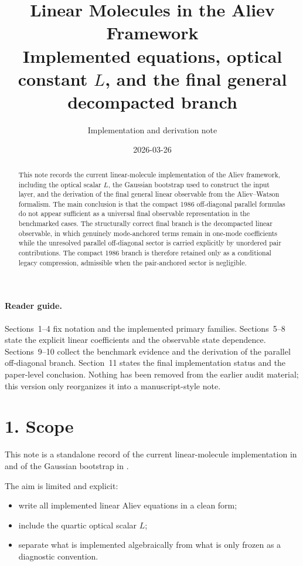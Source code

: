\documentclass[11pt]{article}
\title{Linear Molecules in the Aliev Framework\\
\large Implemented equations, optical constant $L$, and the final general decompacted branch}
\author{Implementation and derivation note}
\date{2026-03-26}
\begin{document}
\maketitle

\begin{abstract}
This note records the current linear-molecule implementation of the Aliev
framework, including the optical scalar $L$, the Gaussian bootstrap used to
construct the input layer, and the derivation of the final general linear
observable from the Aliev--Watson formalism. The main conclusion is that the
compact 1986 off-diagonal parallel formulas do not appear sufficient as a
universal final observable representation in the benchmarked cases. The
structurally correct final branch is the
decompacted linear observable, in which genuinely mode-anchored terms remain in
one-mode coefficients while the unresolved parallel off-diagonal sector is
carried explicitly by unordered pair contributions. The compact 1986 branch is
therefore retained only as a conditional legacy compression, admissible when
the pair-anchored sector is negligible.
\end{abstract}

\paragraph{Reader guide.}
Sections~1--4 fix notation and the implemented primary families. Sections~5--8
state the explicit linear coefficients and the observable state dependence.
Sections~9--10 collect the benchmark evidence and the derivation of the
parallel off-diagonal branch. Section~11 states the final implementation status
and the paper-level conclusion. Nothing has been removed from the earlier audit
material; this version only reorganizes it into a manuscript-style note.

\section*{1. Scope}

This note is a standalone record of the current linear-molecule implementation in
and of the Gaussian bootstrap in
.

The aim is limited and explicit:
\begin{itemize}
\item write all implemented linear Aliev equations in a clean form;
\item include the quartic optical scalar $L$;
\item separate what is implemented algebraically from what is only frozen as a
diagnostic convention.
\end{itemize}
\end{document}
